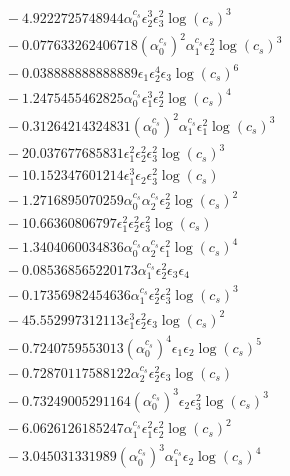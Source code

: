 \documentclass[10pt]{article}
\begin{document}
\begin{align*}
&{}  - 4.9222725748944 \alpha_{0}^{c_s} \epsilon_{2}^{3} \epsilon_{3}^{2} \log{\left(c_{s} \right)}^{3} \\
&{}  - 0.077633262406718 \left(\alpha_{0}^{c_s}\right)^{2} \alpha_{1}^{c_s} \epsilon_{2}^{2} \log{\left(c_{s} \right)}^{3} \\
&{}  - 0.038888888888889 \epsilon_{1} \epsilon_{2}^{4} \epsilon_{3} \log{\left(c_{s} \right)}^{6} \\
&{}  - 1.2475455462825 \alpha_{0}^{c_s} \epsilon_{1}^{3} \epsilon_{2}^{2} \log{\left(c_{s} \right)}^{4} \\
&{}  - 0.31264214324831 \left(\alpha_{0}^{c_s}\right)^{2} \alpha_{1}^{c_s} \epsilon_{1}^{2} \log{\left(c_{s} \right)}^{3} \\
&{}  - 20.037677685831 \epsilon_{1}^{2} \epsilon_{2}^{2} \epsilon_{3}^{2} \log{\left(c_{s} \right)}^{3} \\
&{}  - 10.152347601214 \epsilon_{1}^{3} \epsilon_{2} \epsilon_{3}^{2} \log{\left(c_{s} \right)} \\
&{}  - 1.2716895070259 \alpha_{0}^{c_s} \alpha_{2}^{c_s} \epsilon_{2}^{2} \log{\left(c_{s} \right)}^{2} \\
&{}  - 10.66360806797 \epsilon_{1}^{2} \epsilon_{2}^{2} \epsilon_{3}^{2} \log{\left(c_{s} \right)} \\
&{}  - 1.3404060034836 \alpha_{0}^{c_s} \alpha_{2}^{c_s} \epsilon_{1}^{2} \log{\left(c_{s} \right)}^{4} \\
&{}  - 0.085368565220173 \alpha_{1}^{c_s} \epsilon_{2}^{2} \epsilon_{3} \epsilon_{4} \\
&{}  - 0.17356982454636 \alpha_{1}^{c_s} \epsilon_{2}^{2} \epsilon_{3}^{2} \log{\left(c_{s} \right)}^{3} \\
&{}  - 45.552997312113 \epsilon_{1}^{3} \epsilon_{2}^{2} \epsilon_{3} \log{\left(c_{s} \right)}^{2} \\
&{}  - 0.7240759553013 \left(\alpha_{0}^{c_s}\right)^{4} \epsilon_{1} \epsilon_{2} \log{\left(c_{s} \right)}^{5} \\
&{}  - 0.72870117588122 \alpha_{2}^{c_s} \epsilon_{2}^{2} \epsilon_{3} \log{\left(c_{s} \right)} \\
&{}  - 0.73249005291164 \left(\alpha_{0}^{c_s}\right)^{3} \epsilon_{2} \epsilon_{3}^{2} \log{\left(c_{s} \right)}^{3} \\
&{}  - 6.0626126185247 \alpha_{1}^{c_s} \epsilon_{1}^{2} \epsilon_{2}^{2} \log{\left(c_{s} \right)}^{2} \\
&{}  - 3.045031331989 \left(\alpha_{0}^{c_s}\right)^{3} \alpha_{1}^{c_s} \epsilon_{2} \log{\left(c_{s} \right)}^{4} \\

\end{align*}
\end{document}
